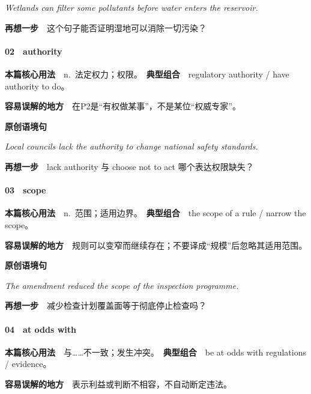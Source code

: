 \documentclass[
  11pt,
]{ctexart}
\renewenvironment{quote}{\begin{tcolorbox}[enhanced,breakable,colback=sand,colframe=primary!22,boxrule=0.4pt,arc=2pt,left=2.6mm,right=2.6mm,top=1.6mm,bottom=1.6mm]\itshape}{\end{tcolorbox}}
\begin{document}
\begin{quote}
Wetlands can filter some pollutants before water enters the reservoir.
\end{quote}

\textbf{再想一步}　这个句子能否证明湿地可以消除一切污染？

\paragraph{02　authority}\label{authority}

\textbf{本篇核心用法}　n.~法定权力；权限。　\textbf{典型组合}　regulatory
authority / have authority to do。

\textbf{容易误解的地方}　在P2是``有权做某事''，不是某位``权威专家''。

\textbf{原创语境句}

\begin{quote}
Local councils lack the authority to change national safety standards.
\end{quote}

\textbf{再想一步}　lack authority 与 choose not to act
哪个表达权限缺失？

\paragraph{03　scope}\label{scope}

\textbf{本篇核心用法}　n.~范围；适用边界。　\textbf{典型组合}　the scope
of a rule / narrow the scope。

\textbf{容易误解的地方}　规则可以变窄而继续存在；不要译成``规模''后忽略其适用范围。

\textbf{原创语境句}

\begin{quote}
The amendment reduced the scope of the inspection programme.
\end{quote}

\textbf{再想一步}　减少检查计划覆盖面等于彻底停止检查吗？

\paragraph{04　at odds with}\label{at-odds-with}

\textbf{本篇核心用法}　与\ldots\ldots 不一致；发生冲突。　\textbf{典型组合}　be
at odds with regulations / evidence。

\textbf{容易误解的地方}　表示利益或判断不相容，不自动断定违法。
\end{document}
